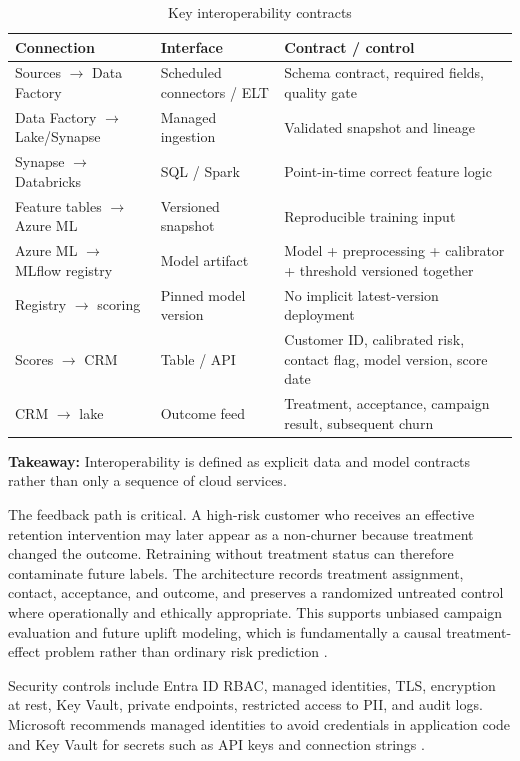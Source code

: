 \documentclass[11pt]{article}
\newcommand{\takeaway}[1]{\vspace{1pt}\noindent\textbf{Takeaway:} #1\vspace{3pt}}
\begin{document}
\begin{table}[H]
\centering\scriptsize
\caption{Key interoperability contracts}
\begin{tabularx}{\textwidth}{p{}p{}Y}
\toprule
Connection & Interface & Contract / control \\
\midrule
Sources $\rightarrow$ Data Factory & Scheduled connectors / ELT & Schema contract, required fields, quality gate \\
Data Factory $\rightarrow$ Lake/Synapse & Managed ingestion & Validated snapshot and lineage \\
Synapse $\rightarrow$ Databricks & SQL / Spark & Point-in-time correct feature logic \\
Feature tables $\rightarrow$ Azure ML & Versioned snapshot & Reproducible training input \\
Azure ML $\rightarrow$ MLflow registry & Model artifact & Model + preprocessing + calibrator + threshold versioned together \\
Registry $\rightarrow$ scoring & Pinned model version & No implicit latest-version deployment \\
Scores $\rightarrow$ CRM & Table / API & Customer ID, calibrated risk, contact flag, model version, score date \\
CRM $\rightarrow$ lake & Outcome feed & Treatment, acceptance, campaign result, subsequent churn \\
\bottomrule
\end{tabularx}
\end{table}
\takeaway{Interoperability is defined as explicit data and model contracts rather than only a sequence of cloud services.}

The feedback path is critical. A high-risk customer who receives an effective retention intervention may later appear as a non-churner because treatment changed the outcome. Retraining without treatment status can therefore contaminate future labels. The architecture records treatment assignment, contact, acceptance, and outcome, and preserves a randomized untreated control where operationally and ethically appropriate. This supports unbiased campaign evaluation and future uplift modeling, which is fundamentally a causal treatment-effect problem rather than ordinary risk prediction \citep{gutierrez2017}.

Security controls include Entra ID RBAC, managed identities, TLS, encryption at rest, Key Vault, private endpoints, restricted access to PII, and audit logs. Microsoft recommends managed identities to avoid credentials in application code and Key Vault for secrets such as API keys and connection strings \citep{managedidentity,keyvault}.
\end{document}
